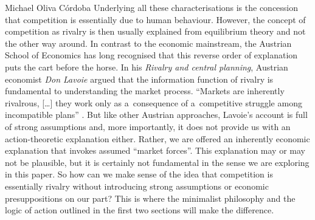 \begin{artengenv}{Michael Oliva Córdoba}
Underlying all these characterisations is the concession that competition is essentially due to human behaviour. However, the concept of competition as rivalry is then usually explained from equilibrium theory and not the other way around. In contrast to the economic mainstream, the Austrian School of Economics has long recognised that this reverse order of explanation puts the cart before the horse. In his \textit{Rivalry and central planning}, Austrian economist \textit{Don Lavoie} argued that the information function of rivalry is fundamental to understanding the market process. ``Markets are inherently rivalrous, […] they work only as a~consequence of a~competitive struggle among incompatible plans'' 
\parencite[][p.~180\ \mbox{[orig.~1985]}]{lavoie_rivalry_2015}. %
 But like other Austrian approaches, Lavoie's account is full of strong assumptions and, more importantly, it does not provide us with an action-theoretic explanation either. Rather, we are offered an inherently economic explanation that invokes assumed ``market forces''. This explanation may or may not be plausible, but it is certainly not fundamental in the sense we are exploring in this paper. So how can we make sense of the idea that competition is essentially rivalry without introducing strong assumptions or economic presuppositions on our part? This is where the minimalist philosophy and the logic of action outlined in the first two sections will make the difference.




\end{artengenv}
